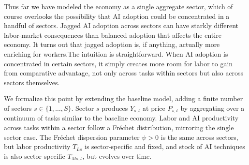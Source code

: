 \documentclass[11pt]{article}
\begin{document}
Thus far we have modeled the economy as a single aggregate sector,
which of course overlooks the possibility that AI adoption could be
concentrated in a handful of sectors. Jagged AI adoption across sectors
can have starkly different labor-market consequences than balanced
adoption that affects the entire economy. It turns out that jagged
adoption is, if anything, actually more enriching for workers.The
intuition is straightforward. When AI adoption is concentrated in
certain sectors, it simply creates more room for labor to gain from
comparative advantage, not only across tasks within sectors but also
across sectors themselves.

We formalize this point by extending the baseline model, adding a
finite number of sectors $s\in\{1,\ldots,S\}$. Sector $s$ produces
$Y_{s,t}$ at price $P_{s,t}$ by aggregating over a continuum of
tasks similar to the baseline economy. Labor and AI productivity across
tasks within a sector follow a Fréchet distribution, mirroring the
single sector case. The Fréchet dispersion parameter $\psi>0$ is
the same across sectors, but labor productivity $T_{Ls}$ is sector-specific
and fixed, and stock of AI techniques is also sector-specific $T_{Ms,t}$,
but evolves over time.
\end{document}
